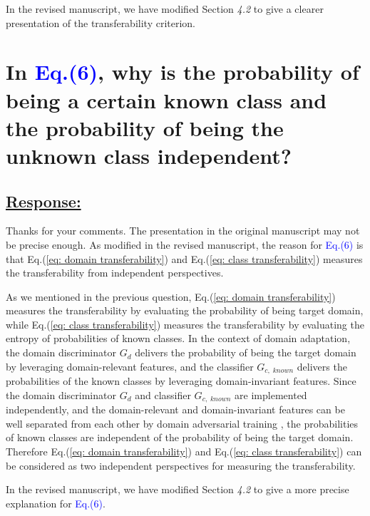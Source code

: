In the revised manuscript, we have modified Section \textit{4.2} to give a clearer presentation of the transferability criterion.


\section{In \textcolor{blue}{Eq.(6)}, why is the probability of being a certain known class and the probability of being the unknown class independent? }
\subsection*{\underline{\textbf{Response:}}}

Thanks for your comments.
The presentation in the original manuscript may not be precise enough. 
As modified in the revised manuscript, the reason for \textcolor{blue}{Eq.(6)} is that Eq.(\ref{eq: domain transferability}) and Eq.(\ref{eq: class transferability}) measures the transferability from independent perspectives.

As we mentioned in the previous question, Eq.(\ref{eq: domain transferability}) measures the transferability by evaluating the probability of being target domain, while Eq.(\ref{eq: class transferability}) measures the transferability by evaluating the entropy of probabilities of known classes.
In the context of domain adaptation, the domain discriminator $G_d$ delivers the probability of being the target domain by leveraging domain-relevant features, and the classifier $G_{c,\; known}$ delivers the probabilities of the known classes by leveraging domain-invariant features.
Since the domain discriminator $G_d$ and classifier $G_{c,\; known}$ are implemented independently, and the domain-relevant and domain-invariant features can be well separated from each other by domain adversarial training \cite{DomainAgnostic}, the probabilities of known classes are independent of the probability of being the target domain.
Therefore Eq.(\ref{eq: domain transferability}) and Eq.(\ref{eq: class transferability}) can be considered as two independent perspectives for measuring the transferability.

In the revised manuscript, we have modified Section \textit{4.2} to give a more precise explanation for \textcolor{blue}{Eq.(6)}.


